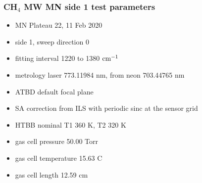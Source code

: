 \documentclass[9pt]{beamer}
\begin{document}
\begin{frame}
\frametitle{CH$_4$ MW MN side 1 test parameters}

\begin{itemize}
  \item MN Plateau 22, 11 Feb 2020
  \item side 1, sweep direction 0
  \item fitting interval 1220 to 1380 $\mbox{cm$^{-1}$}$
  \item metrology laser 773.11984 nm, from neon 703.44765 nm
  \item ATBD default focal plane
  \item SA correction from ILS with periodic sinc at the sensor grid
  \item HTBB nominal T1 360 K, T2 320 K
  \item gas cell pressure 50.00 Torr
  \item gas cell temperature 15.63 C
  \item gas cell length 12.59 cm
\end{itemize}

\end{frame}
\end{document}
